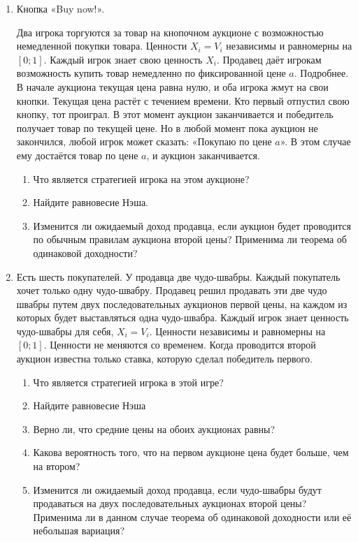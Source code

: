 \begin{enumerate}
\item Кнопка «Buy now!». 

Два игрока торгуются за товар на кнопочном аукционе с возможностью немедленной покупки товара. Ценности $ X_{i}=V_{i} $ независимы и равномерны на $ [0;1] $. Каждый игрок знает свою ценность $ X_{i} $. Продавец даёт игрокам возможность купить товар немедленно по фиксированной цене $ a $. Подробнее. В начале аукциона текущая цена равна нулю, и оба игрока жмут на свои кнопки. Текущая цена растёт с течением времени. Кто первый отпустил свою кнопку, тот проиграл. В этот момент аукцион заканчивается и победитель получает товар по текущей цене. Но в любой момент пока аукцион не закончился, любой игрок может сказать: «Покупаю по цене $ a $». В этом случае ему достаётся товар по цене $ a $, и аукцион заканчивается.
\begin{enumerate}
\item Что является стратегией игрока на этом аукционе?
\item Найдите равновесие Нэша.
\item Изменится ли ожидаемый доход продавца, если аукцион будет проводится по обычным правилам аукциона второй цены? Применима ли теорема об одинаковой доходности?
\end{enumerate}

\item Есть шесть покупателей. У продавца две чудо-швабры. Каждый покупатель хочет только одну чудо-швабру. Продавец решил продавать эти две чудо швабры путем двух последовательных аукционов первой цены, на каждом из которых будет выставляться одна чудо-швабра. Каждый игрок знает ценность чудо-швабры для себя, $ X_{i}=V_{i} $. Ценности независимы и равномерны на $ [0;1] $. Ценности не меняются со временем. Когда проводится второй аукцион известна только ставка, которую сделал победитель первого.

\begin{enumerate}
\item Что является стратегией игрока в этой игре?
\item Найдите равновесие Нэша
\item Верно ли, что средние цены на обоих аукционах равны?
\item Какова вероятность того, что на первом аукционе цена будет больше, чем на втором?
\item Изменится ли ожидаемый доход продавца, если чудо-швабры будут продаваться на двух последовательных аукционах второй цены? Применима ли в данном случае теорема об одинаковой доходности или её небольшая вариация?
\end{enumerate}


\end{enumerate}
